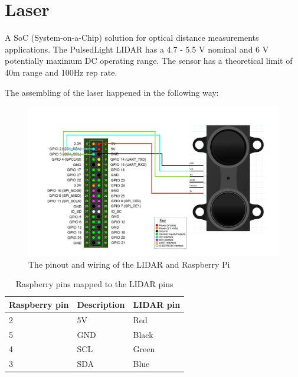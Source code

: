 \clearpage
\section{Laser}

A SoC (System-on-a-Chip) solution for optical distance measurements applications. The PulsedLight LIDAR has a 4.7 - 5.5 V nominal and 6 V potentially maximum DC operating range. The sensor has a theoretical limit of 40m range and 100Hz rep rate.



The assembling of the laser happened in the following way:

\begin{figure}[H]
	\centering
	\includegraphics[scale=.4]{images/laderraspberryconnection.png}
	\caption{The pinout and wiring of the LIDAR and Raspberry Pi}
	\label{fig:wiringlidarpi}
\end{figure}

\begin{table}[H]
	\centering
	\begin{tabular}{|l|l|l|}
		\hline
		\textbf{Raspberry pin} & \textbf{Description} & \textbf{LIDAR pin} \\ \hline
		2 & 5V & Red \\ \hline
		5 & GND & Black \\ \hline
		4 & SCL & Green \\ \hline
		3 & SDA & Blue \\ \hline
	\end{tabular}
	\caption{Raspberry pins mapped to the LIDAR pins}
\end{table}

